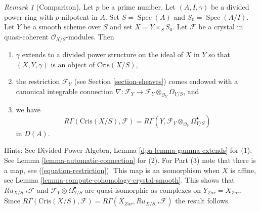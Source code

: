 \documentclass{stacks-project}
\theoremstyle{plain}
\theoremstyle{definition}
\theoremstyle{remark}
\newtheorem{remark}[subsection]{Remark}
\numberwithin{equation}{subsection}
\def\Spec{\mathop{\mathrm{Spec}}}
\begin{document}
\begin{remark}[Comparison]
\label{remark-comparison}
Let $p$ be a prime number. Let $(A, I, \gamma)$ be a divided power
ring with $p$ nilpotent in $A$. Set $S = \Spec(A)$ and
$S_0 = \Spec(A/I)$. Let $Y$ be a smooth scheme over $S$ and set
$X = Y \times_S S_0$. Let
$\mathcal{F}$ be a crystal in quasi-coherent $\mathcal{O}_{X/S}$-modules.
Then
\begin{enumerate}
\item $\gamma$ extends to a divided power structure on the ideal
of $X$ in $Y$ so that $(X, Y, \gamma)$ is an object of $\text{Cris}(X/S)$,
\item the restriction $\mathcal{F}_Y$ (see Section \ref{section-sheaves})
comes endowed with a canonical integrable connection
$\nabla : \mathcal{F}_Y \to
\mathcal{F}_Y \otimes_{\mathcal{O}_Y} \Omega_{Y/S}$, and
\item we have
$$
R\Gamma(\text{Cris}(X/S), \mathcal{F}) =
R\Gamma(Y, \mathcal{F}_Y \otimes_{\mathcal{O}_Y} \Omega^\bullet_{Y/S})
$$
in $D(A)$.
\end{enumerate}
Hints: See Divided Power Algebra, Lemma \ref{dpa-lemma-gamma-extends} for (1).
See Lemma \ref{lemma-automatic-connection} for (2).
For Part (3) note that there is a map, see
(\ref{equation-restriction}). This map is an isomorphism when
$X$ is affine, see
Lemma \ref{lemma-compute-cohomology-crystal-smooth}.
This shows that $Ru_{X/S, *}\mathcal{F}$ and
$\mathcal{F}_Y \otimes \Omega^\bullet_{Y/S}$ are quasi-isomorphic
as complexes on $Y_{Zar} = X_{Zar}$.
Since $R\Gamma(\text{Cris}(X/S), \mathcal{F}) =
R\Gamma(X_{Zar}, Ru_{X/S, *}\mathcal{F})$ the result follows.
\end{remark}
\end{document}
